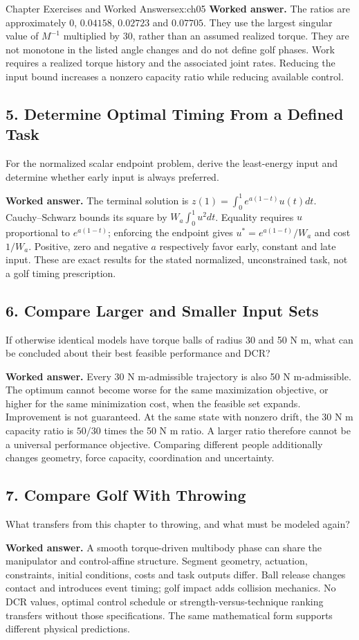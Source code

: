\begin{exercises}{Chapter Exercises and Worked Answers}{ex:ch05}
\textbf{Worked answer.} The ratios are approximately $0$, $0.04158$, $0.02723$ and $0.07705$. They use the largest singular value of $M^{-1}$ multiplied by 30, rather than an assumed realized torque. They are not monotone in the listed angle changes and do not define golf phases. Work requires a realized torque history and the associated joint rates. Reducing the input bound increases a nonzero capacity ratio while reducing available control.

\subsection*{5. Determine Optimal Timing From a Defined Task}
For the normalized scalar endpoint problem, derive the least-energy input and determine whether early input is always preferred.

\textbf{Worked answer.} The terminal solution is $z(1)=\int_0^1e^{a(1-t)}u(t)dt$. Cauchy--Schwarz bounds its square by $W_a\int_0^1u^2dt$. Equality requires $u$ proportional to $e^{a(1-t)}$; enforcing the endpoint gives $u^*=e^{a(1-t)}/W_a$ and cost $1/W_a$. Positive, zero and negative $a$ respectively favor early, constant and late input. These are exact results for the stated normalized, unconstrained task, not a golf timing prescription.

\subsection*{6. Compare Larger and Smaller Input Sets}
If otherwise identical models have torque balls of radius 30 and 50 N m, what can be concluded about their best feasible performance and DCR?

\textbf{Worked answer.} Every 30 N m-admissible trajectory is also 50 N m-admissible. The optimum cannot become worse for the same maximization objective, or higher for the same minimization cost, when the feasible set expands. Improvement is not guaranteed. At the same state with nonzero drift, the 30 N m capacity ratio is $50/30$ times the 50 N m ratio. A larger ratio therefore cannot be a universal performance objective. Comparing different people additionally changes geometry, force capacity, coordination and uncertainty.

\subsection*{7. Compare Golf With Throwing}
What transfers from this chapter to throwing, and what must be modeled again?

\textbf{Worked answer.} A smooth torque-driven multibody phase can share the manipulator and control-affine structure. Segment geometry, actuation, constraints, initial conditions, costs and task outputs differ. Ball release changes contact and introduces event timing; golf impact adds collision mechanics. No DCR values, optimal control schedule or strength-versus-technique ranking transfers without those specifications. The same mathematical form supports different physical predictions.
\end{exercises}

